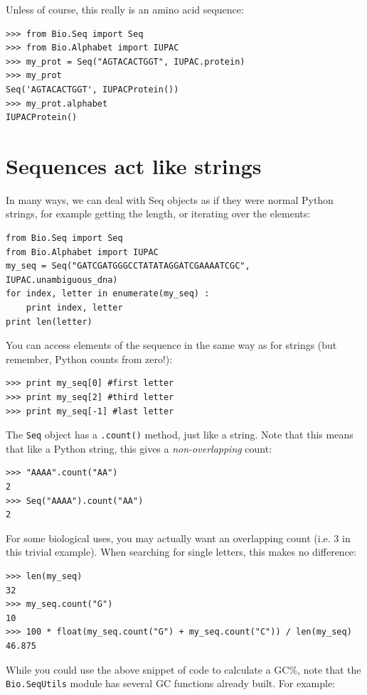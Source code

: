 \documentclass{report}
\begin{document}
Unless of course, this really is an amino acid sequence:

\begin{verbatim}
>>> from Bio.Seq import Seq
>>> from Bio.Alphabet import IUPAC
>>> my_prot = Seq("AGTACACTGGT", IUPAC.protein)
>>> my_prot
Seq('AGTACACTGGT', IUPACProtein())
>>> my_prot.alphabet
IUPACProtein()
\end{verbatim}

\section{Sequences act like strings}

In many ways, we can deal with Seq objects as if they were normal Python strings, for example getting the length, or iterating over the elements:

\begin{verbatim}
from Bio.Seq import Seq
from Bio.Alphabet import IUPAC
my_seq = Seq("GATCGATGGGCCTATATAGGATCGAAAATCGC", IUPAC.unambiguous_dna)
for index, letter in enumerate(my_seq) :
    print index, letter
print len(letter)
\end{verbatim}

You can access elements of the sequence in the same way as for strings (but remember, Python counts from zero!):

\begin{verbatim}
>>> print my_seq[0] #first letter
>>> print my_seq[2] #third letter
>>> print my_seq[-1] #last letter
\end{verbatim}

The \verb|Seq| object has a \verb|.count()| method, just like a string.
Note that this means that like a Python string, this gives a
\emph{non-overlapping} count:

\begin{verbatim}
>>> "AAAA".count("AA")
2
>>> Seq("AAAA").count("AA")
2
\end{verbatim}

\noindent For some biological uses, you may actually want an overlapping count
(i.e. $3$ in this trivial example). When searching for single letters, this
makes no difference:

\begin{verbatim}
>>> len(my_seq)
32
>>> my_seq.count("G")
10
>>> 100 * float(my_seq.count("G") + my_seq.count("C")) / len(my_seq)
46.875
\end{verbatim}

While you could use the above snippet of code to calculate a GC\%, note that  the \verb|Bio.SeqUtils| module has several GC functions already built.  For example:
\end{document}
